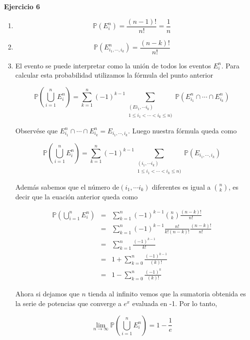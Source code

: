 \documentclass[letter,twoside,12pt]{article}
\begin{document}
\textbf{Ejercicio 6}

\begin{enumerate}[label=\textbf{\arabic*)}]
\item 
\begin{equation}
\mathbb{P}(E_i^n)=\frac{(n-1)!}{n!}=\frac{1}{n} \nonumber 
\end{equation}

\item 
\begin{equation}
\mathbb{P}(E_{i_1,\cdots, i_k}^n)=\frac{(n-k)!}{n!} \nonumber 
\end{equation}
\item El evento se puede interpretar como la unión de todos los eventos $ E_i^n $. Para calcular esta probabilidad utilizamos la fórmula del punto anterior

\begin{equation}
\mathbb{P}(\bigcup_{i=1}^n E_i^n)=\sum_{k=1}^{n} (-1)^{k-1} \sum_{\substack{(Ei_1, \cdots i_k) \\1\leq i_1<\cdots<i_k\leq n)}}\mathbb{P}(E_{i_1}^n \cap \cdots \cap E_{i_k}^n) \nonumber
\end{equation}

Observése que $ E_{i_1}^n \cap \cdots \cap E_{i_k}^n  = E_{i_1,\cdots,i_k}$. Luego nuestra fórmula queda como

\begin{equation}
\mathbb{P}(\bigcup_{i=1}^n E_i^n)=\sum_{k=1}^{n} (-1)^{k-1} \sum_{\substack{(i_1, \cdots i_k) \\1\leq i_1<\cdots<i_k\leq n)}}\mathbb{P}(E_{i_1,\cdots,i_k}) \nonumber
\end{equation}

Además sabemos que el número de$ (i_1, \cdots i_k) $ diferentes es igual a $ \binom{n}{k} $, es decir que la euación anterior queda como

\begin{eqnarray}
\mathbb{P}(\bigcup_{i=1}^n E_i^n)&=&\sum_{k=1}^{n} (-1)^{k-1} \binom{n}{k} \frac{(n-k)!}{n!} \nonumber
\\&=&\sum_{k=1}^{n} (-1)^{k-1} \frac{n!}{k!(n-k)!} \frac{(n-k)!}{n!} \nonumber
\\&=&\sum_{k=1}^{n} \frac{(-1)^{k-1}}{k!} \nonumber
\\&=&1+\sum_{k=0}^{n} \frac{(-1)^{k-1}}{(k)!} \nonumber
\\&=&1-\sum_{k=0}^{n} \frac{(-1)^{k}}{(k)!} \nonumber
\end{eqnarray}

Ahora si dejamos que $ n $ tienda al infinito vemos que la sumatoria obtenida es la serie de potencias que converge a $ e^x $ evaluada en -1. Por lo tanto,

\begin{equation}
\lim_{n \to \infty} \mathbb{P}(\bigcup_{i=1}^n E_i^n)=1-\frac{1}{e} \nonumber
\end{equation}

\end{enumerate}
\end{document}
